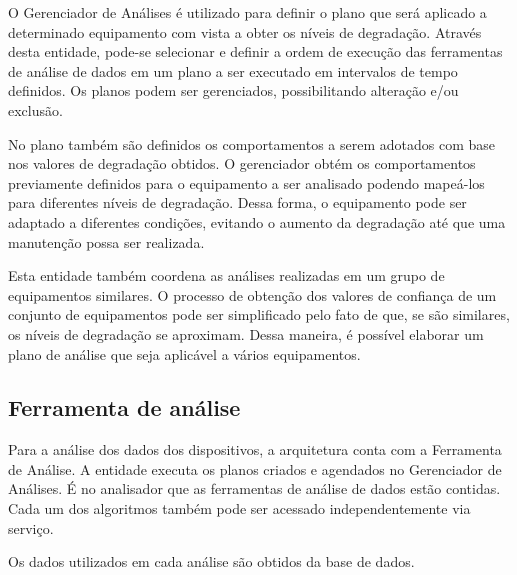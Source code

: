 O Gerenciador de Análises é utilizado para definir o plano que será aplicado a determinado
equipamento com vista a obter os níveis de degradação. Através desta entidade, pode-se selecionar e
definir a ordem de execução das ferramentas de análise de dados em um plano a ser executado em
intervalos de tempo definidos. Os planos podem ser gerenciados, possibilitando alteração e/ou
exclusão.

No plano também são definidos os comportamentos a serem adotados com base nos valores de degradação
obtidos. O gerenciador obtém os comportamentos previamente definidos para o equipamento a ser
analisado podendo mapeá-los para diferentes níveis de degradação. Dessa forma, o equipamento pode
ser adaptado a diferentes condições, evitando o aumento da degradação até que uma manutenção possa
ser realizada.

Esta entidade também coordena as análises realizadas em um grupo de equipamentos similares. O
processo de obtenção dos valores de confiança de um conjunto de equipamentos pode ser simplificado
pelo fato de que, se são similares, os níveis de degradação se aproximam. Dessa maneira, é possível
elaborar um plano de análise que seja aplicável a vários equipamentos.



\subsection{Ferramenta de análise}


Para a análise dos dados dos dispositivos, a arquitetura conta com a Ferramenta de Análise. A
entidade executa os planos criados e agendados no Gerenciador de Análises. É no analisador que as
ferramentas de análise de dados estão contidas. Cada um dos algoritmos também pode ser acessado
independentemente via serviço.

Os dados utilizados em cada análise são obtidos da base de dados.

\iffalse
O gerenciador de análise de dados é utilizado para analisar os dados dos equipamentos sob inspeção
pelo \gls{IMS}. Nele estão contidos os algoritmos para análise, onde a interface de acesso é
oferecida através de serviços. Definida uma ferramenta para análise de determinado equipamento, o
gerenciador obtém os dados da base de dados e executa a ferramenta selecionada. A partir dos
resultados, novos dados são gerados, os quais são inseridos na base de dados do equipamento em
análise\todo{Precisa ser finalizada.}.
\fi


